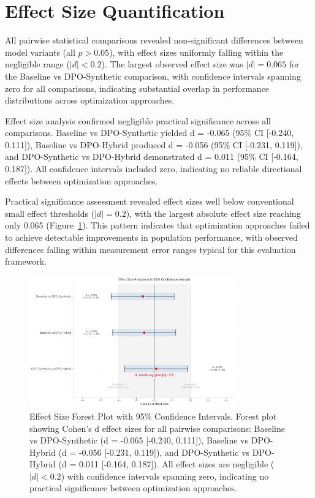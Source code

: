 \section{Effect Size Quantification}
\label{sec:effect-size-analysis}

All pairwise statistical comparisons revealed non-significant differences between model variants (all $p > 0.05$), with effect sizes uniformly falling within the negligible range ($|d| < 0.2$). The largest observed effect size was $|d| = 0.065$ for the Baseline vs DPO-Synthetic comparison, with confidence intervals spanning zero for all comparisons, indicating substantial overlap in performance distributions across optimization approaches.

Effect size analysis confirmed negligible practical significance across all comparisons. Baseline vs DPO-Synthetic yielded d = -0.065 (95\% CI [-0.240, 0.111]), Baseline vs DPO-Hybrid produced d = -0.056 (95\% CI [-0.231, 0.119]), and DPO-Synthetic vs DPO-Hybrid demonstrated d = 0.011 (95\% CI [-0.164, 0.187]). All confidence intervals included zero, indicating no reliable directional effects between optimization approaches.

Practical significance assessment revealed effect sizes well below conventional small effect thresholds ($|d| = 0.2$), with the largest absolute effect size reaching only 0.065 (Figure~\ref{fig:effect-size-forest}). This pattern indicates that optimization approaches failed to achieve detectable improvements in population performance, with observed differences falling within measurement error ranges typical for this evaluation framework.

\begin{figure}[H]
\centering
\includegraphics[width=0.8\textwidth]{figures/effect_size_forest_plot.png}
\caption[Effect Size Forest Plot with 95\% Confidence Intervals]{Effect Size Forest Plot with 95\% Confidence Intervals. Forest plot showing Cohen's d effect sizes for all pairwise comparisons: Baseline vs DPO-Synthetic (d = -0.065 [-0.240, 0.111]), Baseline vs DPO-Hybrid (d = -0.056 [-0.231, 0.119]), and DPO-Synthetic vs DPO-Hybrid (d = 0.011 [-0.164, 0.187]). All effect sizes are negligible ($|d| < 0.2$) with confidence intervals spanning zero, indicating no practical significance between optimization approaches.}
\label{fig:effect-size-forest}
\end{figure}


